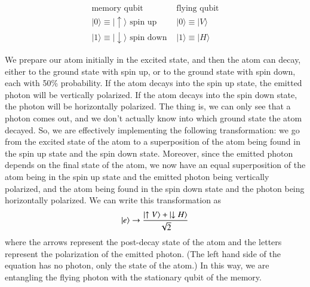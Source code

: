 \begin{equation}
\begin{array}{ll}
\text{memory qubit} & \text{flying qubit} \\
|0\rangle \equiv|\uparrow\rangle \text { spin up } & |0\rangle \equiv|V\rangle \\
|1\rangle \equiv|\downarrow\rangle \text { spin down } & |1\rangle \equiv|H\rangle
\end{array}
\end{equation}

We prepare our atom initially in the excited state, and then the atom can decay, either to the ground state with spin up, or to the ground state with spin down, each with 50\% probability.  If the atom decays into the spin up state, the emitted photon will be vertically polarized.  If the atom decays into the spin down state, the photon will be horizontally polarized.  The thing is, we can only see that a photon comes out, and we don't actually know into which ground state the atom decayed. So, we are effectively implementing the following transformation: we go from the excited state of the atom to a superposition of the atom being found in the spin up state and the spin down state. 
Moreover, since the emitted photon depends on the final state of the atom, we now have an equal superposition of the atom being in the spin up state and the emitted photon being vertically polarized, and the atom being found in the spin down state and the photon being horizontally polarized. We can write this transformation as
\begin{equation}
\left| e \right\rangle \rightarrow \frac{\left| \uparrow V \right\rangle+\left| \downarrow H \right\rangle}{\sqrt{2}}
\end{equation}
where the arrows represent the post-decay state of the atom and the letters represent the polarization of the emitted photon.  (The left hand side of the equation has no photon, only the state of the atom.) In this way, we are entangling the flying photon with the stationary qubit of the memory.

